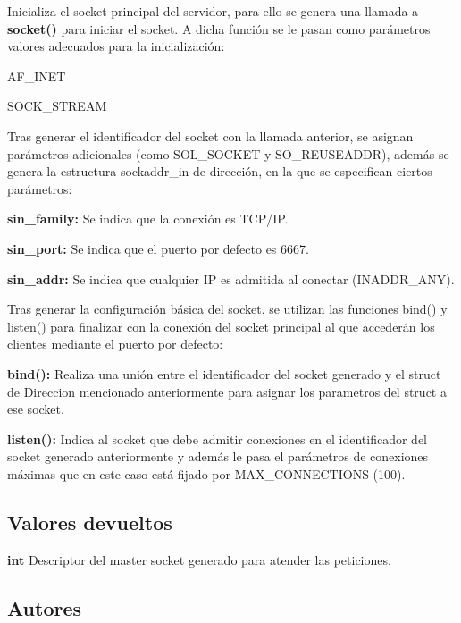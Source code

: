 Inicializa el socket principal del servidor, para ello se genera una llamada a {\bfseries socket()} para iniciar el socket. A dicha función se le pasan como parámetros valores adecuados para la inicialización\+: 
\begin{DoxyItemize}
\item A\+F\+\_\+\+I\+N\+E\+T 
\item S\+O\+C\+K\+\_\+\+S\+T\+R\+E\+A\+M 
\end{DoxyItemize}Tras generar el identificador del socket con la llamada anterior, se asignan parámetros adicionales (como S\+O\+L\+\_\+\+S\+O\+C\+K\+E\+T y S\+O\+\_\+\+R\+E\+U\+S\+E\+A\+D\+D\+R), además se genera la estructura sockaddr\+\_\+in de dirección, en la que se especifican ciertos parámetros\+: 
\begin{DoxyItemize}
\item {\bfseries sin\+\_\+family\+:} Se indica que la conexión es T\+C\+P/\+I\+P. 
\item {\bfseries sin\+\_\+port\+:} Se indica que el puerto por defecto es 6667. 
\item {\bfseries sin\+\_\+addr\+:} Se indica que cualquier I\+P es admitida al conectar (I\+N\+A\+D\+D\+R\+\_\+\+A\+N\+Y). 
\end{DoxyItemize}Tras generar la configuración básica del socket, se utilizan las funciones bind() y listen() para finalizar con la conexión del socket principal al que accederán los clientes mediante el puerto por defecto\+: 
\begin{DoxyItemize}
\item {\bfseries bind()\+:} Realiza una unión entre el identificador del socket generado y el struct de Direccion mencionado anteriormente para asignar los parametros del struct a ese socket. 
\item {\bfseries listen()\+:} Indica al socket que debe admitir conexiones en el identificador del socket generado anteriormente y además le pasa el parámetros de conexiones máximas que en este caso está fijado por M\+A\+X\+\_\+\+C\+O\+N\+N\+E\+C\+T\+I\+O\+N\+S (100). 
\end{DoxyItemize}\hypertarget{server_start_return2}{}\subsection{Valores devueltos}\label{server_start_return2}

\begin{DoxyItemize}
\item {\bfseries int} Descriptor del master socket generado para atender las peticiones. 
\end{DoxyItemize}\hypertarget{server_start_authors2}{}\subsection{Autores}\label{server_start_authors2}

